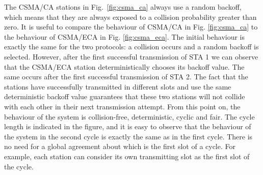 \documentclass[journal]{IEEEtran}
\begin{document}
The CSMA/CA stations in Fig.~\ref{fig:csma_ca} always use a random backoff, which means that they are always exposed to a collision probability greater than zero.
%
It is useful to compare the behaviour of CSMA/CA in Fig. \ref{fig:csma_ca} to the behaviour of CSMA/ECA in Fig. \ref{fig:csma_eca}.
The initial behaviour is exactly the same for the two protocols: a collision occurs and a random backoff is selected.
However, after the first successful transmission of STA 1 we can observe that the CSMA/ECA station deterministically chooses its backoff value.
The same occurs after the first successful transmission of STA 2.
The fact that the stations have successfully transmitted in different slots and use the same deterministic backoff value guarantees that these two stations will not collide with each other in their next transmission attempt.
From this point on, the behaviour of the system is collision-free, deterministic, cyclic and fair.
The cycle length is indicated in the figure, and it is easy to observe that the behaviour of the system in the second cycle is exactly the same as in the first cycle.
There is no need for a global agreement about which is the first slot of a cycle.
For example, each station can consider its own transmitting slot as the first slot of the cycle.
\end{document}
